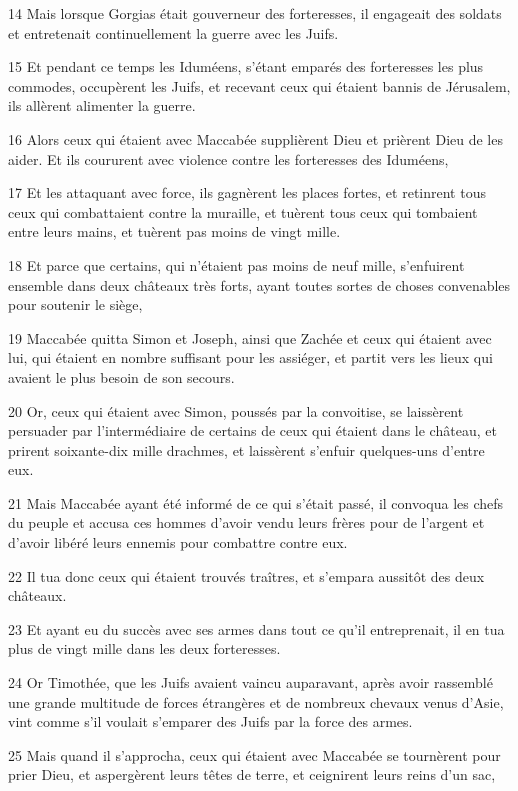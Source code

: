 \par 14 Mais lorsque Gorgias était gouverneur des forteresses, il engageait des soldats et entretenait continuellement la guerre avec les Juifs.
\par 15 Et pendant ce temps les Iduméens, s'étant emparés des forteresses les plus commodes, occupèrent les Juifs, et recevant ceux qui étaient bannis de Jérusalem, ils allèrent alimenter la guerre.
\par 16 Alors ceux qui étaient avec Maccabée supplièrent Dieu et prièrent Dieu de les aider. Et ils coururent avec violence contre les forteresses des Iduméens,
\par 17 Et les attaquant avec force, ils gagnèrent les places fortes, et retinrent tous ceux qui combattaient contre la muraille, et tuèrent tous ceux qui tombaient entre leurs mains, et tuèrent pas moins de vingt mille.
\par 18 Et parce que certains, qui n'étaient pas moins de neuf mille, s'enfuirent ensemble dans deux châteaux très forts, ayant toutes sortes de choses convenables pour soutenir le siège,
\par 19 Maccabée quitta Simon et Joseph, ainsi que Zachée et ceux qui étaient avec lui, qui étaient en nombre suffisant pour les assiéger, et partit vers les lieux qui avaient le plus besoin de son secours.
\par 20 Or, ceux qui étaient avec Simon, poussés par la convoitise, se laissèrent persuader par l'intermédiaire de certains de ceux qui étaient dans le château, et prirent soixante-dix mille drachmes, et laissèrent s'enfuir quelques-uns d'entre eux.
\par 21 Mais Maccabée ayant été informé de ce qui s'était passé, il convoqua les chefs du peuple et accusa ces hommes d'avoir vendu leurs frères pour de l'argent et d'avoir libéré leurs ennemis pour combattre contre eux.
\par 22 Il tua donc ceux qui étaient trouvés traîtres, et s'empara aussitôt des deux châteaux.
\par 23 Et ayant eu du succès avec ses armes dans tout ce qu'il entreprenait, il en tua plus de vingt mille dans les deux forteresses.
\par 24 Or Timothée, que les Juifs avaient vaincu auparavant, après avoir rassemblé une grande multitude de forces étrangères et de nombreux chevaux venus d'Asie, vint comme s'il voulait s'emparer des Juifs par la force des armes.
\par 25 Mais quand il s'approcha, ceux qui étaient avec Maccabée se tournèrent pour prier Dieu, et aspergèrent leurs têtes de terre, et ceignirent leurs reins d'un sac,
